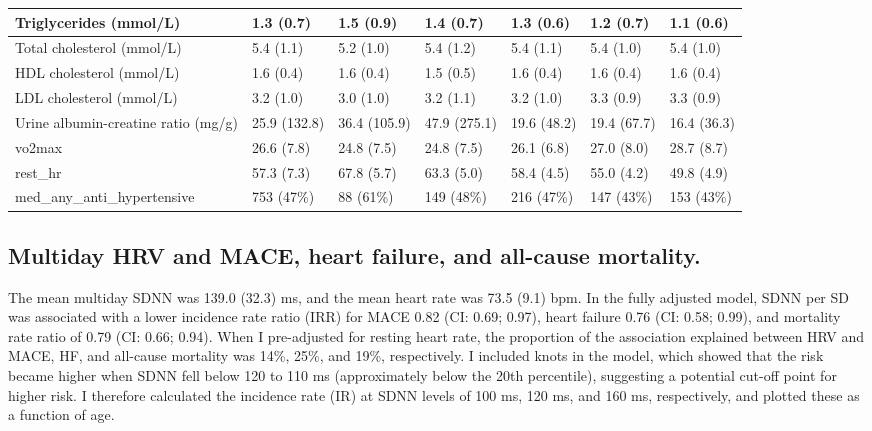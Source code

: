 \documentclass[
  a4paper,
  headsepline=true,
  open=any]{scrbook}
\begin{document}
\begin{table}
{\begin{tabular}{l|l|l|l|l|l|l}
\hline
Triglycerides (mmol/L) & 1.3 (0.7) & 1.5 (0.9) & 1.4 (0.7) & 1.3 (0.6) & 1.2 (0.7) & 1.1 (0.6)\\
\hline
Total cholesterol (mmol/L) & 5.4 (1.1) & 5.2 (1.0) & 5.4 (1.2) & 5.4 (1.1) & 5.4 (1.0) & 5.4 (1.0)\\
\hline
HDL cholesterol (mmol/L) & 1.6 (0.4) & 1.6 (0.4) & 1.5 (0.5) & 1.6 (0.4) & 1.6 (0.4) & 1.6 (0.4)\\
\hline
LDL cholesterol (mmol/L) & 3.2 (1.0) & 3.0 (1.0) & 3.2 (1.1) & 3.2 (1.0) & 3.3 (0.9) & 3.3 (0.9)\\
\hline
Urine albumin-creatine ratio (mg/g) & 25.9 (132.8) & 36.4 (105.9) & 47.9 (275.1) & 19.6 (48.2) & 19.4 (67.7) & 16.4 (36.3)\\
\hline
vo2max & 26.6 (7.8) & 24.8 (7.5) & 24.8 (7.5) & 26.1 (6.8) & 27.0 (8.0) & 28.7 (8.7)\\
\hline
rest\_hr & 57.3 (7.3) & 67.8 (5.7) & 63.3 (5.0) & 58.4 (4.5) & 55.0 (4.2) & 49.8 (4.9)\\
\hline
med\_any\_anti\_hypertensive & 753 (47\%) & 88 (61\%) & 149 (48\%) & 216 (47\%) & 147 (43\%) & 153 (43\%)\\
\hline
\end{tabular}}
\end{table}

\hypertarget{multiday-hrv-and-mace-heart-failure-and-all-cause-mortality.}{%
\subsection{Multiday HRV and MACE, heart failure, and all-cause
mortality.}\label{multiday-hrv-and-mace-heart-failure-and-all-cause-mortality.}}

The mean multiday SDNN was 139.0 (32.3) ms, and the mean heart rate was
73.5 (9.1) bpm. In the fully adjusted model, SDNN per SD was associated
with a lower incidence rate ratio (IRR) for MACE 0.82 (CI: 0.69; 0.97),
heart failure 0.76 (CI: 0.58; 0.99), and mortality rate ratio of 0.79
(CI: 0.66; 0.94). When I pre-adjusted for resting heart rate, the
proportion of the association explained between HRV and MACE, HF, and
all-cause mortality was 14\%, 25\%, and 19\%, respectively. I included
knots in the model, which showed that the risk became higher when SDNN
fell below 120 to 110 ms (approximately below the 20th percentile),
suggesting a potential cut-off point for higher risk. I therefore
calculated the incidence rate (IR) at SDNN levels of 100 ms, 120 ms, and
160 ms, respectively, and plotted these as a function of age.
\end{document}
